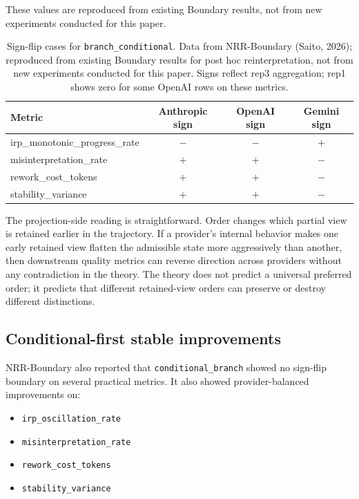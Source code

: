 \documentclass[11pt,a4paper]{article}
\begin{document}
These values are reproduced from existing Boundary results, not from new experiments conducted for this paper.

\begin{table}[h]
\centering
\small
\begin{tabular}{p{5.2cm}ccc}
\toprule
Metric & Anthropic sign & OpenAI sign & Gemini sign \\
\midrule
irp\_monotonic\_progress\_rate & $-$ & $-$ & $+$ \\
misinterpretation\_rate & $+$ & $+$ & $-$ \\
rework\_cost\_tokens & $+$ & $+$ & $-$ \\
stability\_variance & $+$ & $+$ & $-$ \\
\bottomrule
\end{tabular}
\caption{Sign-flip cases for \texttt{branch\_conditional}. Data from NRR-Boundary (Saito, 2026); reproduced from existing Boundary results for post hoc reinterpretation, not from new experiments conducted for this paper. Signs reflect rep3 aggregation; rep1 shows zero for some OpenAI rows on these metrics.}
\label{tab:boundary_signflip}
\end{table}

The projection-side reading is straightforward. Order changes which partial view is retained earlier in the trajectory. If a provider's internal behavior makes one early retained view flatten the admissible state more aggressively than another, then downstream quality metrics can reverse direction across providers without any contradiction in the theory. The theory does not predict a universal preferred order; it predicts that different retained-view orders can preserve or destroy different distinctions.

\subsection{Conditional-first stable improvements}

NRR-Boundary also reported that \texttt{conditional\_branch} showed no sign-flip boundary on several practical metrics. It also showed provider-balanced improvements on:
\begin{itemize}
  \item \texttt{irp\_oscillation\_rate}
  \item \texttt{misinterpretation\_rate}
  \item \texttt{rework\_cost\_tokens}
  \item \texttt{stability\_variance}
\end{itemize}
\end{document}
